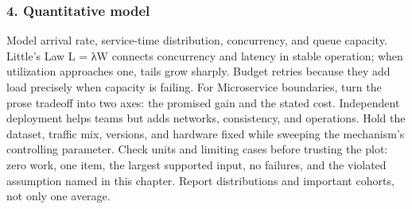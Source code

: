 \subsubsection*{4. Quantitative model}
Model arrival rate, service-time distribution, concurrency, and queue capacity. Little's Law L = λW connects concurrency and latency in stable operation; when utilization approaches one, tails grow sharply. Budget retries because they add load precisely when capacity is failing.
For Microservice boundaries, turn the prose tradeoff into two axes: the promised gain and the stated cost. Independent deployment helps teams but adds networks, consistency, and operations. Hold the dataset, traffic mix, versions, and hardware fixed while sweeping the mechanism's controlling parameter.
Check units and limiting cases before trusting the plot: zero work, one item, the largest supported input, no failures, and the violated assumption named in this chapter. Report distributions and important cohorts, not only one average.
